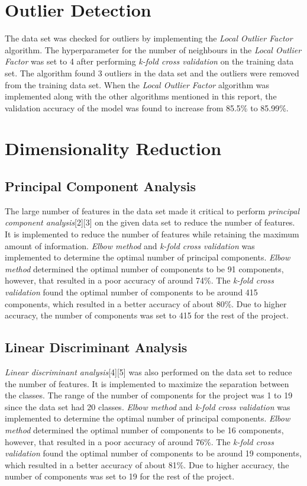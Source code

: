 \documentclass[conference]{IEEEtran}
\begin{document}
\section{Outlier Detection}
    The data set was checked for outliers by implementing the \textit{Local Outlier Factor} algorithm. The hyperparameter for the number of neighbours in the \textit{Local Outlier Factor} was set to 4 after performing \textit{k-fold cross validation} on the training data set. 
    The algorithm found 3 outliers in the data set and the outliers were removed from the training data set. When the \textit{Local Outlier Factor} algorithm was implemented along with the other algorithms mentioned in this report, the validation accuracy of the model was found to increase from 85.5\% to 85.99\%. 

\section{Dimensionality Reduction}
\subsection{Principal Component Analysis}
    The large number of features in the data set made it critical to perform \textit{principal component analysis}[2][3] on the given data set to reduce the number of features. It is implemented to reduce the number of features while retaining the maximum amount of information. \textit{Elbow method} and \textit{k-fold cross validation} was implemented to determine the optimal number of principal components. \textit{Elbow method} determined the optimal number of components to be 91 components, however, that resulted in a poor accuracy of around 74\%. 
    The \textit{k-fold cross validation} found the optimal number of components to be around 415 components, which resulted in a better accuracy of about 80\%.
    Due to higher accuracy, the number of components was set to 415 for the rest of the project.
\subsection{Linear Discriminant Analysis}
    \textit{Linear discriminant analysis}[4][5] was also performed on the data set to reduce the number of features. It is implemented to maximize the separation between the classes. The range of the number of components for the project was 1 to 19 since the data set had 20 classes. \textit{Elbow method} and \textit{k-fold cross validation} was implemented to determine the optimal number of principal components. \textit{Elbow method} determined the optimal number of components to be 16 components, however, that resulted in a poor accuracy of around 76\%. 
    The \textit{k-fold cross validation} found the optimal number of components to be around 19 components, which resulted in a better accuracy of about 81\%.
    Due to higher accuracy, the number of components was set to 19 for the rest of the project.
\end{document}
